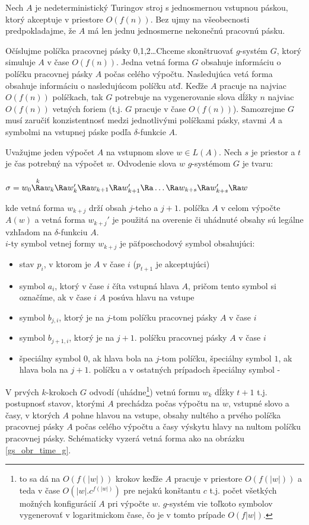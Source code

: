 \begin{dokaz}
Nech $A$ je nedeterministický Turingov stroj s jednosmernou
vstupnou páskou, ktorý akceptuje v priestore $O(f(n))$. Bez ujmy
na všeobecnosti predpokladajme, že $A$ má len jednu jednosmerne
nekonečnú pracovnú pásku.

Očíslujme políčka pracovnej pásky 0,1,2\dots Chceme skonštruovať
$g$-systém $G$, ktorý simuluje $A$ v čase $O(f(n))$. Jedna vetná
forma $G$ obsahuje informáciu o políčku pracovnej pásky $A$ počas
celého výpočtu. Nasledujúca vetá forma obsahuje informáciu o
nasledujúcom políčku atď. Keďže $A$ pracuje na najviac $O(f(n))$
políčkach, tak $G$ potrebuje na vygenerovanie slova dĺžky $n$
najviac $O(f(n))$ vetných foriem (t.j. $G$ pracuje v čase
$O(f(n))$). Samozrejme $G$ musí zaručiť konzistentnosť medzi
jednotlivými políčkami pásky, stavmi $A$ a symbolmi na vstupnej
páske podľa $\delta$-funkcie $A$.

Uvažujme jeden výpočet $A$ na vstupnom slove $w\in L(A)$. Nech $s$
je priestor a $t$ je čas potrebný na výpočet $w$. Odvodenie slova
$w$ $g$-systémom $G$ je tvaru:

\centerline{$\sigma =w_0\overset{k}\Ra w_k\Ra w_k'\Ra w_{k+1}\Ra
w_{k+1}'\Ra\dots\Ra w_{k+s}\Ra w_{k+s}'\Ra w$} kde vetná forma
$w_{k+j}$ drží obsah $j$-teho a $j+1$. políčka $A$ v celom výpočte
$A(w)$ a vetná forma $w_{k+j}'$ je použitá na overenie či uhádnuté
obsahy sú legálne vzhľadom na $\delta$-funkciu $A$.\\ $i$-ty
symbol vetnej formy $w_{k+j}$ je päťposchodový symbol obsahujúci:

\begin{itemize}
  \item stav $p_i$, v ktorom je $A$ v čase $i$ ($p_{t+1}$ je akceptujúci)
  \item symbol $a_i$, ktorý v čase $i$ číta vstupná hlava $A$, pričom tento symbol si
  označíme, ak v čase $i$ $A$ posúva hlavu na vstupe
  \item symbol $b_{j,i}$, ktorý je na $j$-tom políčku pracovnej pásky $A$ v čase $i$
  \item symbol $b_{j+1,i}$, ktorý je na $j+1$. políčku pracovnej pásky $A$ v čase $i$
  \item špeciálny symbol $0$, ak hlava bola na $j$-tom políčku, špeciálny symbol $1$, ak
  hlava bola na $j+1$. políčku a v ostatných prípadoch špeciálny
  symbol -
\end{itemize}

V prvých $k$-krokoch $G$ odvodí (uhádne\footnote{to sa dá na
$O(f(|w|))$ krokov keďže $A$ pracuje v priestore $O(f(|w|))$ a
teda v čase $O(|w|.c^{f(|w|)})$ pre nejakú konštantu $c$ t.j.
počet všetkých možných konfigurácií $A$ pri výpočte $w$. $g$-systém vie toľkoto
symbolov vygenerovať v logaritmickom čase, čo je v tomto prípade $O(f|w|)$.}) vetnú
formu $w_k$ dĺžky $t+1$ t.j. postupnosť stavov, ktorými $A$
prechádza počas výpočtu na $w$, vstupné slovo a časy, v ktorých
$A$ pohne hlavou na vstupe, obsahy nultého a prvého políčka
pracovnej pásky $A$ počas celého výpočtu a časy výskytu hlavy na
nultom políčku pracovnej pásky. Schématicky vyzerá vetná forma ako
na obrázku \ref{gs_obr_time_g}.


\end{dokaz}
